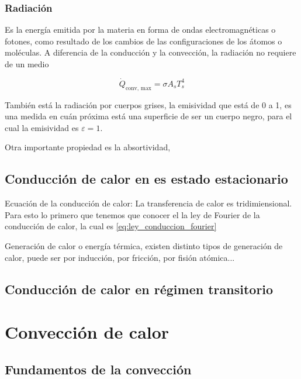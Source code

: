 \documentclass[11pt]{report}
\theoremstyle{plain}
\theoremstyle{definition}
\begin{document}
\subsection{Radiación}

Es la energía emitida por la materia en forma de ondas electromagnéticas o fotones, como resultado de los cambios de las configuraciones de los átomos o moléculas. A diferencia de la conducción y la convección, la radiación no requiere de un medio

\begin{equation}
	\dot{Q}_\text{conv, max} = \sigma A_s T^4_s
	\label{eq:radiacion}
\end{equation}


También está la radiación por cuerpos grises, la emisividad que está de 0 a 1, es una medida en cuán próxima está una superficie de ser un cuerpo negro, para el cual la emisividad es $\varepsilon = 1$.


Otra importante propiedad es la absortividad, 

\section{Conducción de calor en es estado estacionario}

Ecuación de la conducción de calor: La transferencia de calor es tridimiensional. Para esto lo primero que tenemos que conocer el la ley de Fourier de la conducción de calor, la cual es \ref{eq:ley_conduccion_fourier}


Generación de calor o energía térmica, existen distinto tipos de generación de calor, puede ser por inducción, por fricción, por fisión atómica... 

\section{Conducción de calor en régimen transitorio}


\chapter{Convección de calor}
%
\section{Fundamentos de la convección}
%
\end{document}
